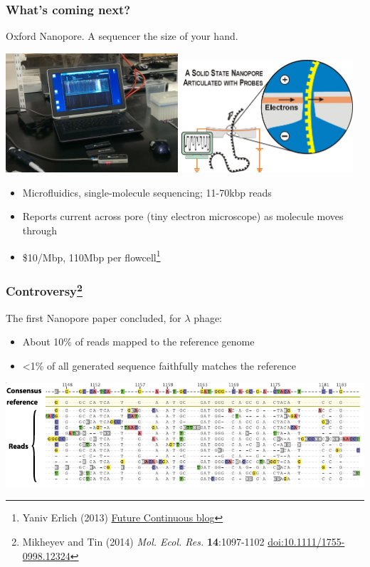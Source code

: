 \begin{frame}
  \frametitle{What's coming next?}
  Oxford Nanopore. A sequencer the size of your hand.
    \begin{center}
      \includegraphics[width=0.48\textwidth]{images/minion_run}\thinspace
      \includegraphics[width=0.48\textwidth]{images/nanopore_schematic}
    \end{center} 
    \begin{itemize}
      \item Microfluidics, single-molecule sequencing; 11-70kbp reads
      \item Reports current across pore (tiny electron microscope) as molecule moves through
      \item \$10/Mbp, 110Mbp per flowcell\footnote{\tiny{Yaniv Erlich (2013) \href{http://erlichya.tumblr.com/post/66376172948/hands-on-experience-with-oxford-nanopore-minion}{Future Continuous blog}}}
    \end{itemize}          
\end{frame}

\begin{frame}
  \frametitle{Controversy\footnote{\tiny{Mikheyev and Tin (2014) \textit{Mol. Ecol. Res.} \textbf{14}:1097-1102 \href{http://dx.doi.org/10.1111/1755-0998.12324}{doi:10.1111/1755-0998.12324}}}}
  The first Nanopore paper concluded, for $\lambda$ phage:
    \begin{itemize}
      \item About 10\% of reads mapped to the reference genome
      \item \textless1\% of all generated sequence faithfully matches the reference
    \end{itemize}   
    \begin{center}
      \includegraphics[width=1\textwidth]{images/nanopore_aln}
    \end{center}           
\end{frame}

